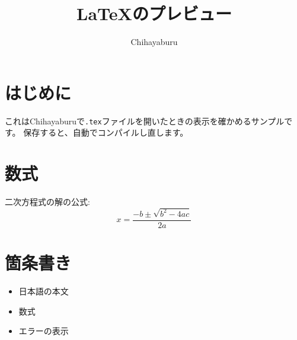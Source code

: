 \documentclass[a4paper,11pt]{ltjsarticle}
\title{LaTeXのプレビュー}
\author{Chihayaburu}
\date{}
\begin{document}
\maketitle

\section{はじめに}
これはChihayaburuで\texttt{.tex}ファイルを開いたときの表示を確かめるサンプルです。
保存すると、自動でコンパイルし直します。

\section{数式}
二次方程式の解の公式:
\[
  x = \frac{-b \pm \sqrt{b^2 - 4ac}}{2a}
\]

\section{箇条書き}
\begin{itemize}
  \item 日本語の本文
  \item 数式
  \item エラーの表示
\end{itemize}
\end{document}
